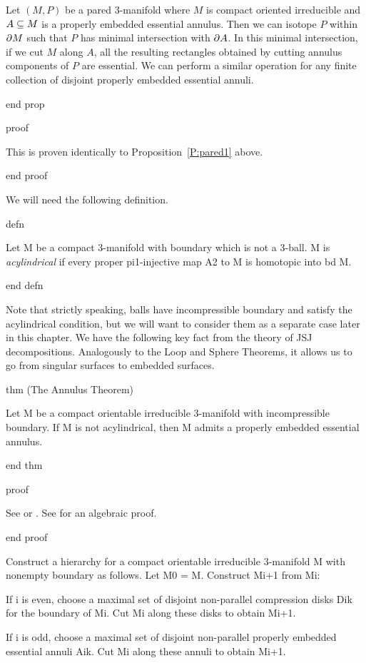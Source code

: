 Let $(M,P)$ be a pared 3-manifold where $M$ is compact oriented irreducible and
$A \subseteq M$ is a properly embedded essential annulus. Then we can isotope $P$
within $\partial M$ such that $P$ has minimal intersection with $\partial A$.  In this
minimal intersection, if we cut $M$ along $A$, all the resulting rectangles
obtained by cutting annulus components of $P$ are essential.  We can perform
a similar operation for any finite collection of disjoint properly embedded
essential annuli.

end prop

proof

This is proven identically to Proposition~\ref{P:pared1} above.

end proof

We will need the following definition.

defn

Let M be a compact 3-manifold with boundary which is not a 3-ball. M is
\emph{acylindrical} if every proper pi1-injective map A2 to M is homotopic into
bd M.

end defn

Note that strictly speaking, balls have incompressible boundary and satisfy the
acylindrical condition, but we will want to consider them as a separate case
later in this chapter. We have the following key fact from the theory of JSJ
decompositions.  Analogously to the Loop and Sphere Theorems, it allows us to
go from singular surfaces to embedded surfaces.

thm (The Annulus Theorem)

Let M be a compact orientable irreducible 3-manifold with incompressible
boundary. If M is not acylindrical, then M admits a properly embedded essential
annulus.

end thm

proof

See \cite{JacoShalen} or \cite{Johannson}. See \cite{Scottannulus} for an
algebraic proof.

end proof

Construct a hierarchy for a compact orientable irreducible 3-manifold M with
nonempty boundary as follows.  Let M0 = M.  Construct Mi+1 from Mi:

If i is even, choose a maximal set of disjoint non-parallel compression disks
Dik for the boundary of Mi. Cut Mi along these disks to obtain Mi+1.

If i is odd, choose a maximal set of disjoint non-parallel properly embedded
essential annuli Aik. Cut Mi along these annuli to obtain Mi+1.

